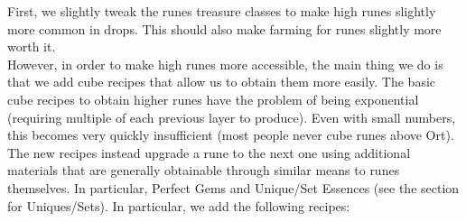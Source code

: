 \documentclass[12pt,a4paper]{article}
\begin{document}
First, we slightly tweak the runes treasure classes to make high runes slightly more common in drops. This should also make farming for runes slightly more worth it.\\

However, in order to make high runes more accessible, the main thing we do is that we add cube recipes that allow us to obtain them more easily. The basic cube recipes to obtain higher runes have the problem of being exponential (requiring multiple of each previous layer to produce). Even with small numbers, this becomes very quickly insufficient (most people never cube runes above Ort). The new recipes instead upgrade a rune to the next one using additional materials that are generally obtainable through similar means to runes themselves. In particular, Perfect Gems and Unique/Set Essences (see the section for Uniques/Sets). In particular, we add the following recipes:
\end{document}
